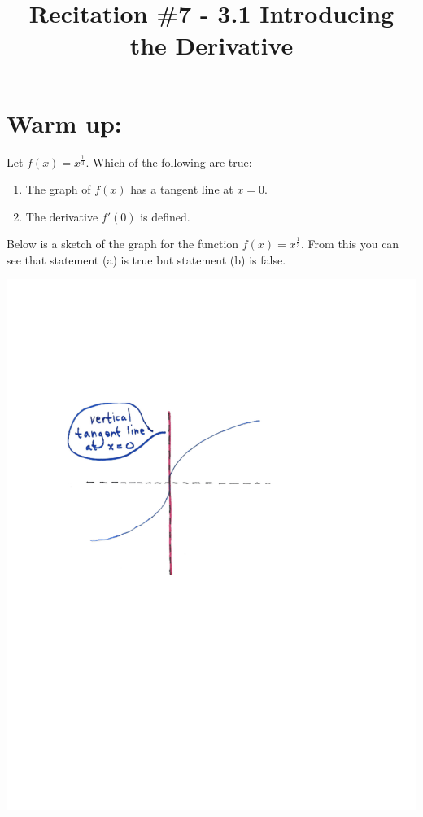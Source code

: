 \documentclass[handout,nooutcomes]{ximera}
\title{Recitation \#7 - 3.1 Introducing the Derivative}
\begin{document}
\begin{abstract}		\end{abstract}
\maketitle

\section*{Warm up:} 
Let $f(x) = x^{\frac{1}{3}}$.  Which of the following are true:
	
	\begin{enumerate}
	
	\item The graph of $f(x)$ has a tangent line at $x=0$.
	
	\item The derivative $f'(0)$ is defined.
	
	\end{enumerate}

		\begin{freeResponse}
		Below is a sketch of the graph for the function $f(x) = x^{\frac{1}{3}}$.  From this you can see that statement (a) is true but statement (b) is false.
			\begin{image}
			\includegraphics[trim= 170 350 250 180]{Figure1.pdf}
			\end{image}
		\end{freeResponse}
	
\end{document}
